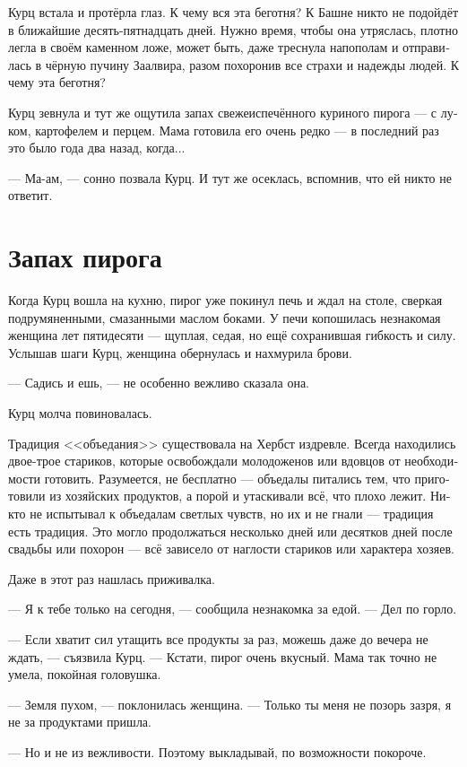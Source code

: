 \documentclass[a4paper,10pt,fleqn]{book}\usepackage{polyglossia}\setdefaultlanguage[babelshorthands=true]{russian}\setotherlanguage{english}\defaultfontfeatures{Ligatures=TeX,Mapping=tex-text}\usepackage{xcolor}\newcommand{\ml}[3]{#2}
\begin{document}
Курц встала и протёрла глаз.
К чему вся эта беготня?
К Башне никто не подойдёт в ближайшие десять-пятнадцать дней.
Нужно время, чтобы она утряслась, плотно легла в своём каменном ложе, может быть, даже треснула напополам и отправилась в чёрную пучину Заалвира, разом похоронив все страхи и надежды людей.
К чему эта беготня?

Курц зевнула и тут же ощутила запах свежеиспечённого куриного пирога --- с луком, картофелем и перцем.
Мама готовила его очень редко --- в последний раз это было года два назад, когда...

--- Ма-ам, --- сонно позвала Курц.
И тут же осеклась, вспомнив, что ей никто не ответит.

\section{Запах пирога}

Когда Курц вошла на кухню, пирог уже покинул печь и ждал на столе, сверкая подрумяненными, смазанными маслом боками.
У печи копошилась незнакомая женщина лет пятидесяти --- щуплая, седая, но ещё сохранившая гибкость и силу.
Услышав шаги Курц, женщина обернулась и нахмурила брови.

--- Садись и ешь, --- не особенно вежливо сказала она.

Курц молча повиновалась.

Традиция <<объедания>> существовала на Хербст издревле.
Всегда находились двое-трое стариков, которые освобождали молодоженов или вдовцов от необходимости готовить.
Разумеется, не бесплатно --- объедалы питались тем, что приготовили из хозяйских продуктов, а порой и утаскивали всё, что плохо лежит.
Никто не испытывал к объедалам светлых чувств, но их и не гнали --- традиция есть традиция.
Это могло продолжаться несколько дней или десятков дней после свадьбы или похорон --- всё зависело от наглости стариков или характера хозяев.

Даже в этот раз нашлась приживалка.

--- Я к тебе только на сегодня, --- сообщила незнакомка за едой.
--- Дел по горло.

--- Если хватит сил утащить все продукты за раз, можешь даже до вечера не ждать, --- съязвила Курц.
--- Кстати, пирог очень вкусный.
Мама так точно не умела, покойная головушка.

--- Земля пухом, --- поклонилась женщина.
--- Только ты меня не позорь зазря, я не за продуктами пришла.

--- Но и не из вежливости.
Поэтому выкладывай, по возможности покороче.
\end{document}
